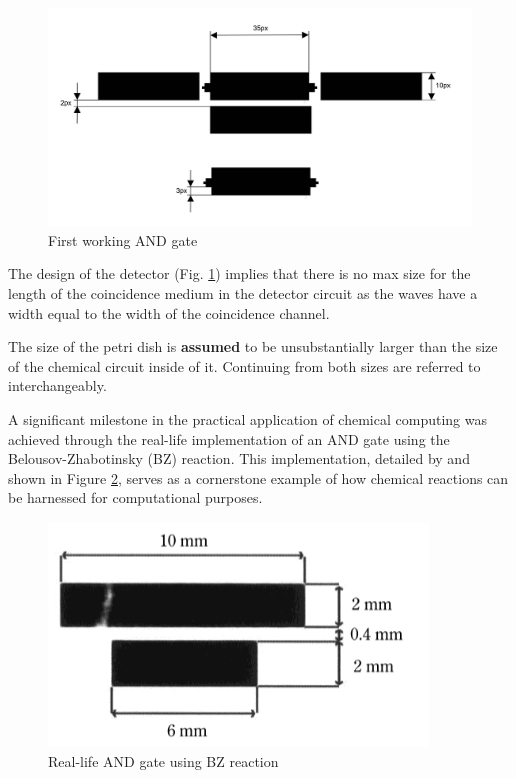 \begin{figure}
    \centering
    \includegraphics[width=1\linewidth]{measurement-and.jpg}
    \caption{First working AND gate}
    \label{fig:and-gate}
\end{figure}

The design of the detector (Fig. \ref{fig:and-gate}) implies that there is no max size for the length of the coincidence medium in the detector circuit as the waves have a width equal to the width of the coincidence channel.
\begin{tcolorbox}[colback=red!5!white,colframe=red!75!black,title=Assumption]
    The size of the petri dish is \textbf{assumed} to be unsubstantially larger than the size of the chemical circuit inside of it. Continuing from both sizes are referred to interchangeably.
\end{tcolorbox}
A significant milestone in the practical application of chemical computing was achieved through the real-life implementation of an AND gate using the Belousov-Zhabotinsky (BZ) reaction. This implementation, detailed by \cite{gorecki2003chemical} and shown in Figure \ref{fig:bz-and-gate}, serves as a cornerstone example of how chemical reactions can be harnessed for computational purposes.

\begin{figure}
    \centering
    \includegraphics[width=0.6\linewidth]{images/Screenshot 2024-03-10 at 20.59.51.png}
    \caption{Real-life AND gate using BZ reaction \citep{gorecki2003chemical}}
    \label{fig:bz-and-gate}
\end{figure}



